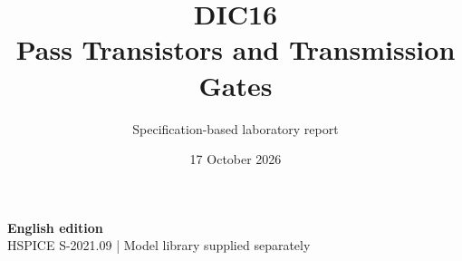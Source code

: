 \documentclass[11pt,a4paper]{article}
\title{\color{accent}DIC16\\[4pt]Pass Transistors and Transmission Gates}
\author{Specification-based laboratory report}
\date{17 October 2026}
\begin{document}
\maketitle
\begin{center}\small\textbf{English edition}\\
HSPICE S-2021.09 \quad | \quad Model library supplied separately
\end{center}


\end{document}
